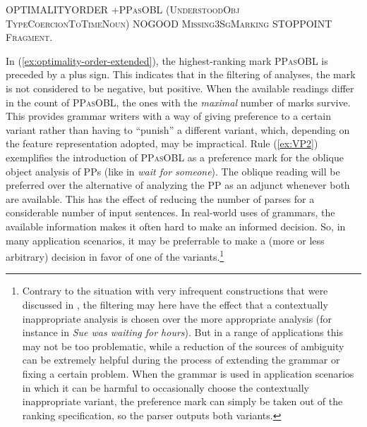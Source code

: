 \documentclass[output=paper,hidelinks]{langscibook}
\begin{document}
\ea\label{ex:optimality-order-extended}
OPTIMALITYORDER \textsc{+PPasOBL (UnderstoodObj  TypeCoercionToTimeNoun) NOGOOD Missing3SgMarking STOPPOINT Fragment}.
\z

\noindent
In (\ref{ex:optimality-order-extended}), the highest-ranking mark  \textsc{PPasOBL} is preceded by a plus sign. This indicates that in the filtering of analyses, the mark is not considered to be negative, but positive. 
When the available readings differ in the count of \textsc{PPasOBL}, the ones with the \emph{maximal} number of marks survive. This provides grammar writers with a way of giving preference to a certain variant rather than having to ``punish'' a different variant, 
which, depending on the feature representation adopted, may be impractical. Rule (\ref{ex:VP2}) exemplifies the introduction of \textsc{PPasOBL} as a preference mark for the oblique object analysis of PPs (like in \emph{wait for someone}). The oblique reading will be preferred over the alternative of analyzing the PP as an adjunct whenever both are available. This has the effect of reducing the number of parses for a considerable number of input sentences.  In real-world uses of grammars, the available information makes it often hard to make an informed decision. So, in many application scenarios, it may be preferrable to make a (more or less arbitrary) decision in favor of one of the variants.\footnote{Contrary to the situation with very infrequent constructions that were discussed in , the filtering may here have the effect that a contextually inappropriate analysis is chosen over the more appropriate analysis (for instance in \emph{Sue was waiting for hours}). But in a range of applications this may not be too problematic, while a reduction of the sources of ambiguity can be extremely helpful during the process of extending the grammar or fixing a certain problem. When the grammar is used in application scenarios in which it can be harmful to occasionally choose the contextually inappropriate variant, the preference mark can simply be taken out of the ranking specification, so the parser outputs both variants.} %

\ea \label{ex:VP2}
\z
\end{document}
